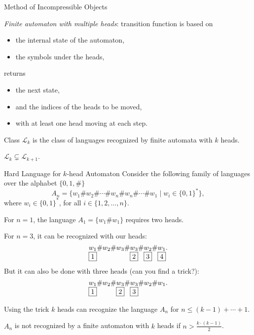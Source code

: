 \documentclass[aspectratio=169]{beamer}
\newcommand{\bits}{\{0,1\}}
\newcommand{\bitstr}{\bits^*}
\begin{document}
\begin{frame}{Method of Incompressible Objects}
    \begin{definition}
        \emph{Finite automaton with multiple heads}: transition function is based on
        \begin{itemize}
            \item the internal state of the automaton,
            \item the symbols under the heads,
        \end{itemize}
        returns
        \begin{itemize}
            \item the next state,
            \item and the indices of the heads to be moved,
            \item with at least one head moving at each step.
        \end{itemize}
    \end{definition}

    Class $\mathcal{L}_k$ is the class of languages recognized by finite automata with $k$ heads.

    \begin{theorem}\label{thm:kDFA}
        $\mathcal{L}_k \subsetneq \mathcal{L}_{k+1}$.
    \end{theorem}

\end{frame}


\begin{frame}[fragile]{Hard Language for $k$-head Automaton}
    Consider the following family of languages over the alphabet $\{0,1,\#\}$
    \[
    A_n = \{w_1\#w_2\#\dotsb\#w_n\#w_n\#\dotsb\#w_1 \mid w_i \in \bitstr\},
    \]
    where $w_i \in \bitstr$, for all $i \in \{1,2,\dotsc,n\}$.

    For $n = 1$, the language $A_1 = \{w_1\#w_1\}$ requires two heads.\pause

    For $n = 3$, it can be recognized with our heads:
    \[
    \underset{\fbox{1}}{w_1}\#w_2\#w_3\#\underset{\fbox{2}}{w_3}\#\underset{\fbox{3}}{w_2}\#\underset{\fbox{4}}{w_1}.
    \]\pause
    But it can also be done with three heads (can you find a trick?):\pause
    \[
    \underset{\fbox{1}}{w_1}\#w_2\#\underset{\fbox{2}}{w_3}\#\underset{\fbox{3}}{w_3}\#w_2\#w_1.
    \]\pause

    Using the trick $k$ heads can recognize the language $A_n$ for $n \le (k-1) + \dotsb + 1$.
    \begin{lemma}
        $A_n$ is not recognized by a finite automaton with $k$ heads if $n > \frac{k \cdot (k-1)}{2}$.
    \end{lemma}
\end{frame}
\end{document}

